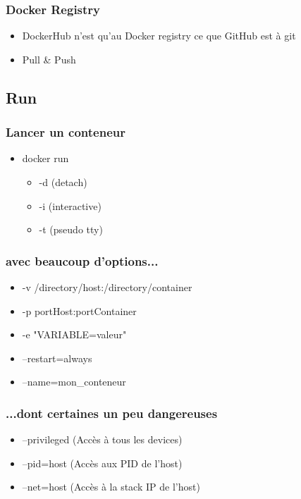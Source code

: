   \begin{frame}
    \frametitle{Docker Registry}
    \begin{itemize}
      \item DockerHub n'est qu'au Docker registry ce que GitHub est à git
      \item Pull & Push
    \end{itemize}
  \end{frame}

  \subsection[Docker]{Run}

  \begin{frame}
    \frametitle{Lancer un conteneur}
    \begin{itemize}
      \item docker run
        \begin{itemize}
          \item -d (detach)
          \item -i (interactive)
          \item -t (pseudo tty)
        \end{itemize}
    \end{itemize}
  \end{frame}

  \begin{frame}
    \frametitle{avec beaucoup d'options...}
    \begin{itemize}
      \item -v /directory/host:/directory/container
      \item -p portHost:portContainer
      \item -e "VARIABLE=valeur"
      \item --restart=always
      \item --name=mon_conteneur
    \end{itemize}
  \end{frame}

  \begin{frame}
    \frametitle{...dont certaines un peu dangereuses}
    \begin{itemize}
      \item --privileged (Accès à tous les devices)
      \item --pid=host (Accès aux PID de l'host)
      \item --net=host (Accès à la stack IP de l'host)
    \end{itemize}
  \end{frame}

